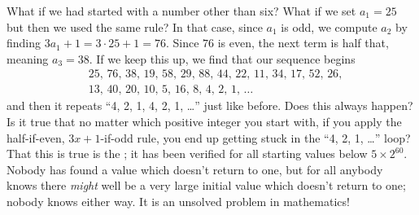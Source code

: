 \documentclass{ximera}
\begin{document}
\begin{exercise}
\begin{exercise}
\begin{exercise}
\begin{exercise}
\begin{exercise}
\begin{exercise}
  \end{exercise}
  What if we had started with a number other than six?  What if we set
  $a_1 = 25$ but then we used the same rule?  In that case, since
  $a_1$ is odd, we compute $a_2$ by finding $3 a_1 + 1 = 3 \cdot 25 +
  1 = 76$.  Since $76$ is even, the next term is half that, meaning
  $a_3 = 38$.  If we keep this up, we find that our sequence begins
  \begin{align*}
    &25,\, 76,\, 38,\, 19,\, 58,\, 29,\, 88,\, 44,\, 22,\, 11,\, 34,\, 17,\, 52,\, 26, \\
    &13,\, 40,\, 20,\, 10,\, 5,\, 16,\, 8,\, 4,\, 2, \, 1, \, \ldots
  \end{align*}
  and then it repeats ``4, 2, 1, 4, 2, 1, \ldots'' just like before.
  Does this always happen?  Is it true that no matter which positive
  integer you start with, if you apply the half-if-even, $3x+1$-if-odd
  rule, you end up getting stuck in the ``4, 2, 1, \ldots'' loop?
  That this is true is the ; it has been
  verified for all starting values below $5 \times 2^{60}$.  Nobody
  has found a value which doesn't return to one, but for all anybody
  knows there \textit{might} well be a very large initial value which
  doesn't return to one; nobody knows either way.  It is an unsolved
  problem in mathematics!

\end{exercise}
  \end{exercise}
  \end{exercise}
  \end{exercise}
  \end{exercise}
\end{document}
